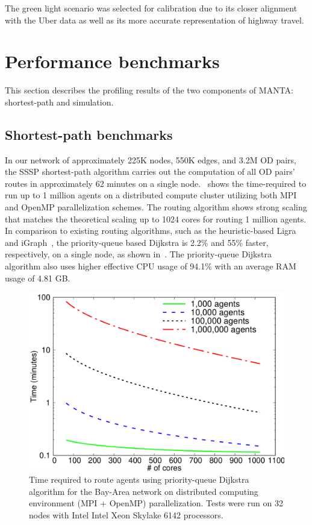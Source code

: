 \documentclass[final]{IEEEtran}
\begin{document}
The green light scenario was selected for calibration due to its closer alignment with the Uber data as well as its more accurate representation of highway travel.


\section{Performance benchmarks}

This section describes the profiling results of the two components of MANTA: shortest-path and simulation. 

\subsection{Shortest-path benchmarks}

In our network of approximately 225K nodes, 550K edges, and 3.2M OD pairs, the SSSP shortest-path algorithm carries out the computation of all OD pairs' routes in approximately 62 minutes on a single node.~ shows the time-required to run up to 1 million agents on a distributed compute cluster utilizing both MPI and OpenMP parallelization schemes. The routing algorithm shows strong scaling that matches the theoretical scaling up to 1024 cores for routing 1 million agents. In comparison to existing routing algorithms, such as the heuristic-based Ligra~\cite{shun2013ligra} and iGraph~\cite{csardi2006igraph}, the priority-queue based Dijkstra is 2.2\% and 55\% faster, respectively, on a single node, as shown in~. The priority-queue Dijkstra algorithm also uses higher effective CPU usage of 94.1\% with an average RAM usage of 4.81 GB.

\begin{figure}
    \centering
    \includegraphics[width=\linewidth]{figs/time.png}
    \caption{Time required to route agents using priority-queue Dijkstra algorithm for the Bay-Area network on distributed computing environment (MPI + OpenMP) parallelization. Tests were run on 32 nodes with Intel Intel Xeon Skylake 6142 processors.}
    \label{fig:time}
\end{figure}
\end{document}
